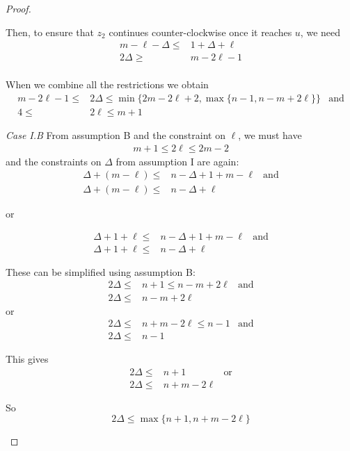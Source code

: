 \documentclass[letterpaper, 10pt]{article}
\begin{document}
\begin{proof}
\begin{proofpart}
Then, to ensure that $z_2$ continues counter-clockwise once
it reaches $u$, we need
\begin{align*}
  m - \ell - \Delta \leq &1 + \Delta + \ell \\
  2 \Delta \geq & m - 2\ell  -1 \\
\end{align*}

When we combine all the restrictions we obtain
\begin{align*}
m - 2\ell -1 \leq & 2 \Delta \leq \min \{ 2m - 2\ell +2, \max \{ n-1, n-m+2\ell \} \}& \text{and}\\
4 \leq & 2 \ell \leq m + 1
\end{align*}

\textit{Case I.B}
From assumption B and the constraint on $\ell$, we must have
\begin{align*}
  m + 1 \leq 2 \ell \leq 2m - 2
\end{align*}
and the constraints on $\Delta$ from assumption I are again:
\begin{align*}
  \Delta + (m - \ell) \leq & n - \Delta + 1 + m - \ell & \text{and}\\
 \Delta + (m - \ell) \leq & n - \Delta + \ell
\end{align*}
\begin{center}or\end{center}
\begin{align*}
\Delta + 1 + \ell \leq &n - \Delta + 1 + m - \ell & \text{and} \\
 \Delta + 1 + \ell \leq & n - \Delta + \ell
\end{align*}

These can be simplified using assumption B:
\begin{align*}
2 \Delta \leq & n+1 \leq n-m+2\ell & \text{and} \\
2 \Delta \leq & n - m + 2\ell
\end{align*}
or
\begin{align*}
2 \Delta \leq & n+m -2 \ell \leq n-1 & \text{and} \\
2 \Delta \leq & n -1
\end{align*}

This gives
\begin{align*}
  2 \Delta \leq & n + 1 & \text{or} \\
  2 \Delta \leq & n + m - 2\ell
\end{align*}

So
\[ 2 \Delta \leq \max \{ n+1, n + m - 2\ell \} \]


\end{proofpart}
\end{proof}
\end{document}
